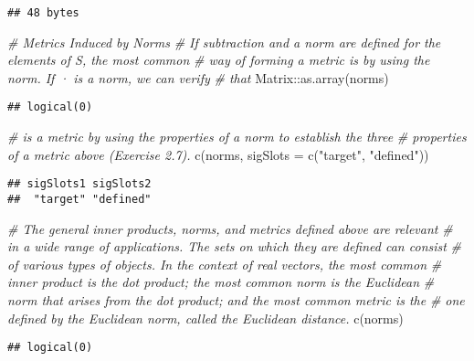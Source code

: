 \documentclass[
]{article}
\newenvironment{Shaded}{\begin{snugshade}}{\end{snugshade}}
\newcommand{\AttributeTok}[1]{\textcolor[rgb]{0.77,0.63,0.00}{#1}}
\newcommand{\CommentTok}[1]{\textcolor[rgb]{0.56,0.35,0.01}{\textit{#1}}}
\newcommand{\FunctionTok}[1]{\textcolor[rgb]{0.00,0.00,0.00}{#1}}
\newcommand{\NormalTok}[1]{#1}
\newcommand{\SpecialCharTok}[1]{\textcolor[rgb]{0.00,0.00,0.00}{#1}}
\newcommand{\StringTok}[1]{\textcolor[rgb]{0.31,0.60,0.02}{#1}}
\begin{document}
\begin{verbatim}
## 48 bytes
\end{verbatim}

\begin{Shaded}
\begin{Highlighting}[]
\CommentTok{\# Metrics Induced by Norms}
\CommentTok{\# If subtraction and a norm are deﬁned for the elements of S, the most common}
\CommentTok{\# way of forming a metric is by using the norm. If · is a norm, we can verify}
\CommentTok{\# that}
\NormalTok{Matrix}\SpecialCharTok{::}\FunctionTok{as.array}\NormalTok{(norms)}
\end{Highlighting}
\end{Shaded}

\begin{verbatim}
## logical(0)
\end{verbatim}

\begin{Shaded}
\begin{Highlighting}[]
\CommentTok{\# is a metric by using the properties of a norm to establish the three }
\CommentTok{\# properties of a metric above (Exercise 2.7).}
\FunctionTok{c}\NormalTok{(norms, }\AttributeTok{sigSlots =} \FunctionTok{c}\NormalTok{(}\StringTok{"target"}\NormalTok{, }\StringTok{"defined"}\NormalTok{))}
\end{Highlighting}
\end{Shaded}

\begin{verbatim}
## sigSlots1 sigSlots2 
##  "target" "defined"
\end{verbatim}

\begin{Shaded}
\begin{Highlighting}[]
\CommentTok{\# The general inner products, norms, and metrics deﬁned above are relevant}
\CommentTok{\# in a wide range of applications. The sets on which they are deﬁned can consist}
\CommentTok{\# of various types of objects. In the context of real vectors, the most common}
\CommentTok{\# inner product is the dot product; the most common norm is the Euclidean}
\CommentTok{\# norm that arises from the dot product; and the most common metric is the}
\CommentTok{\# one deﬁned by the Euclidean norm, called the Euclidean distance.}
\FunctionTok{c}\NormalTok{(norms)}
\end{Highlighting}
\end{Shaded}

\begin{verbatim}
## logical(0)
\end{verbatim}
\end{document}
